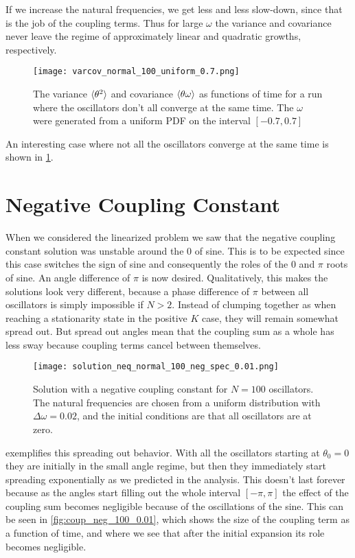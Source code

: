 \documentclass[10pt,a4paper,twocolumn]{article}
\begin{document}
If we increase the natural frequencies, we get less and less slow-down, since that is the job of the coupling terms. Thus for large $\omega$ the variance and covariance never leave the regime of approximately linear and quadratic growths, respectively.

\begin{figure}[!h]
    \centering
    \texttt{[image: varcov\_normal\_100\_uniform\_0.7.png]}
    \caption{The variance $\braket{\theta^2}$ and covariance $\braket{\theta \omega}$ as functions of time for a run where the oscillators don't all converge at the same time. The $\omega$ were generated from a uniform PDF on the interval $[-0.7, 0.7]$}
    \label{fig:varcov_100_spec}
\end{figure}

An interesting case where not all the oscillators converge at the same time is shown in \cref{fig:varcov_100_spec}.

\section{Negative Coupling Constant}

When we considered the linearized problem we saw that the negative coupling constant solution was unstable around the $0$ of sine. This is to be expected since this case switches the sign of sine and consequently the roles of the $0$ and $\pi$ roots of sine. An angle difference of $\pi$ is now desired. Qualitatively, this makes the solutions look very different, because a phase difference of $\pi$ between all oscillators is simply impossible if $N > 2$. Instead of clumping together as when reaching a stationarity state in the positive $K$ case, they will remain somewhat spread out. But spread out angles mean that the coupling sum as a whole has less sway because coupling terms cancel between themselves.

\begin{figure}[!h]
    \centering
    \texttt{[image: solution\_neq\_normal\_100\_neg\_spec\_0.01.png]}
    \caption{Solution with a negative coupling constant for $N=100$ oscillators. The natural frequencies are chosen from a uniform distribution with $\Delta \omega = 0.02$, and the initial conditions are that all oscillators are at zero.}
    \label{fig:sol_neg_100_0.01}
\end{figure}

 exemplifies this spreading out behavior. With all the oscillators starting at $\theta_0=0$ they are initially in the small angle regime, but then they immediately start spreading exponentially as we predicted in the analysis. This doesn't last forever because as the angles start filling out the whole interval $[-\pi, \pi]$ the effect of the coupling sum becomes negligible because of the oscillations of the sine. This can be seen in \cref{fig:coup_neg_100_0.01}, which shows the size of the coupling term as a function of time, and where we see that after the initial expansion its role becomes negligible.
\end{document}
